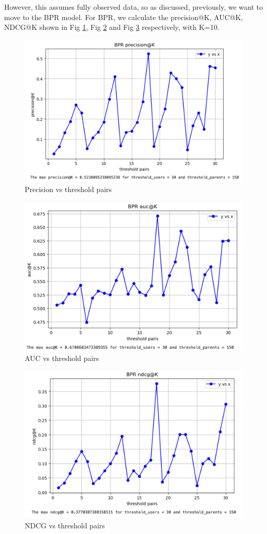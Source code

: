 \documentclass{article}
\begin{document}
However, this assumes fully observed data, so as discussed, previously, we want to move to the BPR model.
For BPR, we calculate the precision@K, AUC@K, NDCG@K shown in Fig \ref{fig:bpr_precision}, Fig \ref{fig:bpr_auc} and Fig \ref{fig:bpr_ndcg} respectively, with K=10. 

\begin{figure}[ht]
    \centering
    \includegraphics[width=0.75\linewidth]{DSC210_Project_Report/images/bpr_plot_precision.png}
    \caption{Precision vs threshold pairs}
    \label{fig:bpr_precision}
\end{figure}
\begin{figure}
    \centering
    \includegraphics[width=0.75\linewidth]{DSC210_Project_Report/images/bpr_plot_auc.png}
    \caption{AUC vs threshold pairs}
    \label{fig:bpr_auc}
\end{figure}
\begin{figure}
    \centering
    \includegraphics[width=0.75\linewidth]{DSC210_Project_Report/images/bpr_plot_ndcg.png}
    \caption{NDCG vs threshold pairs}
    \label{fig:bpr_ndcg}
\end{figure}
\end{document}
